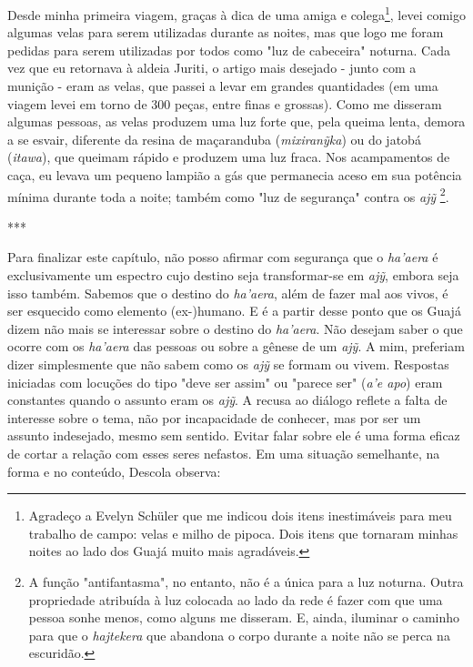 Desde minha primeira viagem, graças à dica de uma amiga e
colega\footnote{Agradeço a Evelyn Schüler que me indicou dois itens
  inestimáveis para meu trabalho de campo: velas e milho de pipoca. Dois
  itens que tornaram minhas noites ao lado dos Guajá muito mais
  agradáveis.}, levei comigo algumas velas para serem utilizadas durante
as noites, mas que logo me foram pedidas para serem utilizadas por todos
como "luz de cabeceira" noturna. Cada vez que eu retornava à aldeia
Juriti, o artigo mais desejado - junto com a munição - eram as velas,
que passei a levar em grandes quantidades (em uma viagem levei em torno
de 300 peças, entre finas e grossas). Como me disseram algumas pessoas,
as velas produzem uma luz forte que, pela queima lenta, demora a se
esvair, diferente da resina de maçaranduba (\emph{mixiranỹka}) ou do
jatobá (\emph{itawa}), que queimam rápido e produzem uma luz fraca. Nos
acampamentos de caça, eu levava um pequeno lampião a gás que permanecia
aceso em sua potência mínima durante toda a noite; também como "luz de
segurança" contra os \emph{ajỹ} \footnote{A função "antifantasma", no
  entanto, não é a única para a luz noturna. Outra propriedade atribuída
  à luz colocada ao lado da rede é fazer com que uma pessoa sonhe menos,
  como alguns me disseram. E, ainda, iluminar o caminho para que o
  \emph{hajtekera} que abandona o corpo durante a noite não se perca na
  escuridão.}.

***

Para finalizar este capítulo, não posso afirmar com segurança que o
\emph{ha'aera} é exclusivamente um espectro cujo destino seja
transformar-se em \emph{ajỹ}, embora seja isso também. Sabemos que o
destino do \emph{ha'aera}, além de fazer mal aos vivos, é ser esquecido
como elemento (ex-)humano. E é a partir desse ponto que os Guajá dizem
não mais se interessar sobre o destino do \emph{ha'aera}. Não desejam
saber o que ocorre com os \emph{ha'aera} das pessoas ou sobre a gênese
de um \emph{ajỹ}. A mim, preferiam dizer simplesmente que não sabem como
os \emph{ajỹ} se formam ou vivem. Respostas iniciadas com locuções do
tipo "deve ser assim" ou "parece ser" (\emph{a'e apo}) eram constantes
quando o assunto eram os \emph{ajỹ}. A recusa ao diálogo reflete a falta
de interesse sobre o tema, não por incapacidade de conhecer, mas por ser
um assunto indesejado, mesmo sem sentido. Evitar falar sobre ele é uma
forma eficaz de cortar a relação com esses seres nefastos. Em uma
situação semelhante, na forma e no conteúdo, Descola observa:

